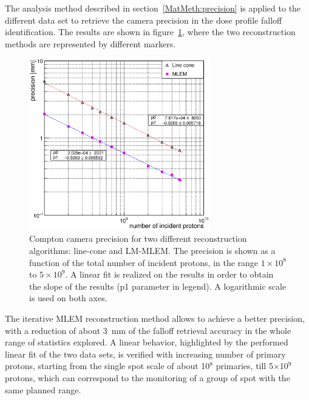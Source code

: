 The analysis method described in section~\ref{MatMeth:precision} is applied to the different data set to retrieve the camera precision in the dose profile falloff identification. The results are shown in figure~\ref{fig:precision}, where the two reconstruction methods are represented by different markers.

\begin{figure}	
\centering
\includegraphics[width=0.7\textwidth]{./Figure/2017-10-21_Precision_Comparaison_linecone_MLEM_Article_Fit.eps}
\caption{Compton camera precision for two different reconstruction algorithms: line-cone and LM-MLEM. The precision is shown as a function of the total number of incident protons, in the range $1\times10^{8}$ to $5\times10^{9}$. A linear fit is realized on the results in order to obtain the slope of the results (p1 parameter in legend). A logarithmic scale is used on both axes. }	
\label{fig:precision}
\end{figure}

The iterative MLEM reconstruction method allows to achieve a better precision, with a reduction of about 3~mm of the falloff retrieval accuracy in the whole range of statistics explored. A linear behavior, highlighted by the performed linear fit of the two data sets, is verified with increasing number of primary protons, starting from the single spot scale of about 10$^8$ primaries, till 5$\times$10$^9$ protons, which can correspond to the monitoring of a group of spot with the same planned range. 

